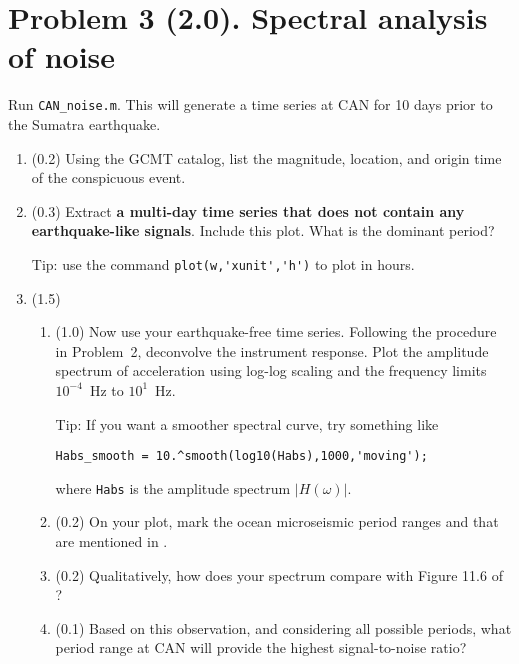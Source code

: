 \documentclass[11pt,titlepage,fleqn]{article}
\begin{document}

\section*{Problem 3 (2.0). Spectral analysis of noise}

Run \verb+CAN_noise.m+. This will generate a time series at CAN for 10 days prior to the Sumatra earthquake.

\begin{enumerate}
\item (0.2) Using the GCMT catalog, list the magnitude, location, and origin time of the conspicuous event. 

\item (0.3) Extract {\bf a multi-day time series that does not contain any earthquake-like signals}. Include this plot. What is the dominant period?

Tip: use the command \verb+plot(w,'xunit','h')+ to plot in hours.

\item (1.5)

\begin{enumerate}
\item (1.0) Now use your earthquake-free time series.
Following the procedure in Problem~2, deconvolve the instrument response.
Plot the amplitude spectrum of acceleration using log-log scaling and the frequency limits $10^{-4}$~Hz to $10^1$~Hz.

Tip: If you want a smoother spectral curve, try something like

\noindent
\verb+Habs_smooth = 10.^smooth(log10(Habs),1000,'moving');+

\noindent
where \verb+Habs+ is the amplitude spectrum $|H(\omega)|$.

\item (0.2) On your plot, mark the ocean microseismic period ranges  and  that are mentioned in \citet[][Section 11.2]{ShearerE2}.

\item (0.2) Qualitatively, how does your spectrum compare with Figure 11.6 of \citet{ShearerE2}?

\item (0.1) Based on this observation, and considering all possible periods, what period range at CAN will provide the highest signal-to-noise ratio?

\end{enumerate}

\end{enumerate}
\end{document}
